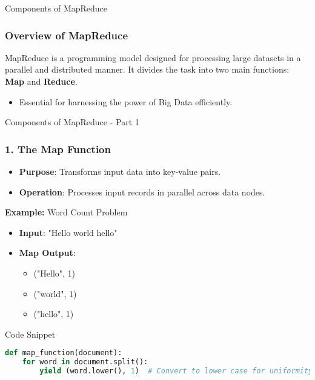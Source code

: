 \documentclass[aspectratio=169]{beamer}
\begin{document}
\begin{frame}{Components of MapReduce}
    \frametitle{Overview of MapReduce}
    MapReduce is a programming model designed for processing large datasets in a parallel and distributed manner. It divides the task into two main functions: \textbf{Map} and \textbf{Reduce}.
    \begin{itemize}
        \item Essential for harnessing the power of Big Data efficiently.
    \end{itemize}
\end{frame}

\begin{frame}[fragile]{Components of MapReduce - Part 1}
    \frametitle{1. The Map Function}
    \begin{itemize}
        \item \textbf{Purpose}: Transforms input data into key-value pairs.
        \item \textbf{Operation}: Processes input records in parallel across data nodes.
    \end{itemize}
    
    \textbf{Example:} Word Count Problem
    \begin{itemize}
        \item \textbf{Input}: "Hello world hello"
        \item \textbf{Map Output}:
        \begin{itemize}
            \item ("Hello", 1)
            \item ("world", 1)
            \item ("hello", 1)
        \end{itemize}
    \end{itemize}

    \begin{block}{Code Snippet}
        \begin{lstlisting}[language=Python]
def map_function(document):
    for word in document.split():
        yield (word.lower(), 1)  # Convert to lower case for uniformity
        \end{lstlisting}
    \end{block}
\end{frame}
\end{document}

